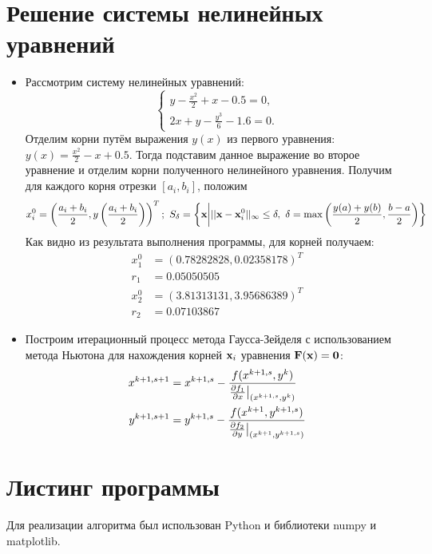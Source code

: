 \documentclass[14pt, a4paper]{article}
\begin{document}
  \section{Решение системы нелинейных уравнений}
  \begin{itemize}
    \item
    Рассмотрим систему нелинейных уравнений:
    $$\begin{cases}y - \frac{x^2}{2} + x - 0.5 = 0, \\ 2x + y - \frac{y^3}{6} - 1.6 = 0.\end{cases}$$
    Отделим корни путём выражения $y(x)$ из первого уравнения: $y(x) = \frac{x^2}{2} - x + 0.5$. Тогда подставим данное выражение во второе уравнение и отделим корни
    полученного нелинейного уравнения. Получим для каждого корня отрезки $[a_i, b_i]$, положим \begin{equation}x_i^0 = \left(\frac{a_i+b_i}{2}, y\left(\frac{a_i+b_i}{2}\right)\right)^T;
    \ S_{\delta} = \left\{ \bold{x} \bigg| ||\bold{x} - \bold{x}_i^0||_{\infty} \leq \delta, \ \delta = \max \left(\frac{y(a) + y(b)}{2}, \frac{b - a}{2} \right) \right\}\end{equation}
    Как видно из результата выполнения программы, для корней получаем:
    \begin{align*}x_1^0 &= \left(0.78282828, 0.02358178\right)^T \\ r_1 &= 0.05050505 \\ x_2^0 &= \left(3.81313131, 3.95686389\right)^T \\ r_2 &= 0.07103867\end{align*}
    \item
    Построим итерационный процесс метода Гаусса-Зейделя с использованием метода Ньютона для нахождения корней $\bold{x}_i$ уравнения $\bold{F}(\bold{x}) = \bold{0}$:
    \begin{align}x^{k + 1, s + 1} &= x^{k + 1, s} - \frac{f(x^{k + 1, s}, y^{k})}{\pdv{f_1}{x}\big|_{(x^{k + 1, s}, y^k)}} \\ y^{k + 1, s + 1} &= y^{k + 1, s} - \frac{f(x^{k + 1}, y^{k + 1, s})}{\pdv{f_2}{y}\big|_{(x^{k + 1}, y^{k + 1, s})}}\end{align}
  \end{itemize}
  \section{Листинг программы}
  Для реализации алгоритма был использован Python и библиотеки numpy и matplotlib.
\end{document}

